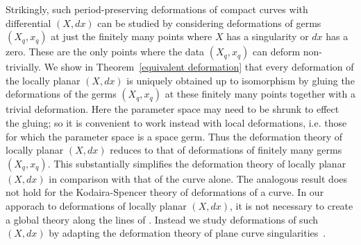 \documentclass[11pt,twoside]{amsart}
\theoremstyle{plain}
\newcommand{\dfx}{dx}
\begin{document}
Strikingly, such period-preserving deformations of compact curves with  differential $ (X,\dfx) $ can be studied by considering  deformations of germs $ (X_q, x_q) $ at just the finitely many points where $X$ has a singularity or $\dfx$ has a zero. These are the only points where the data $ (X_q, x_q) $ can deform non-trivially. We show in Theorem~\ref {equivalent deformation} that every deformation of the locally planar $ (X, \dfx) $ is uniquely obtained up to isomorphism by gluing the deformations of the germs  $(X_q,x_q)$ at these finitely many points together with a trivial deformation. Here the parameter space may need to be shrunk to effect the gluing; so it is convenient to work instead with local deformations, i.e. those for which the parameter space is a space germ. Thus the deformation theory of locally planar $ (X,\dfx) $ reduces to that of deformations of finitely many germs $ (X_q, x_q) $. This substantially simplifies the deformation theory of locally planar $ (X,\dfx) $ in comparison with that of the curve alone.  The analogous result does not hold for the Kodaira-Spencer theory of deformations of a curve.
In our apporach to deformations of locally planar $ (X,\dfx) $, it is  not necessary to create a global theory along the lines of \cite{ACG:11}. Instead we study deformations of such $ (X,\dfx) $ by adapting the deformation theory of plane curve singularities~\cite{dJP:00,GLS:07}. 

\end{document}
